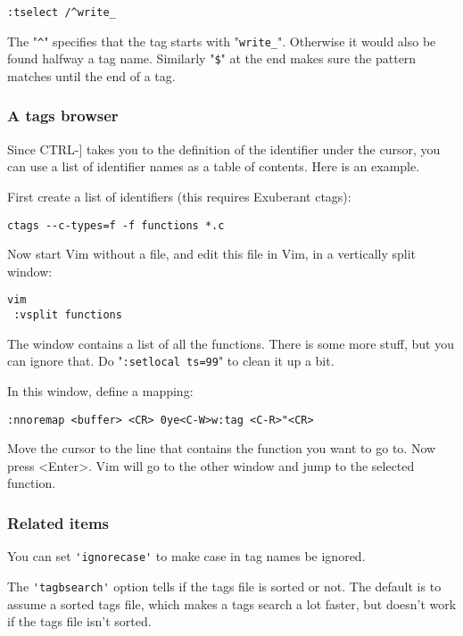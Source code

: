 \begin{Verbatim}[samepage=true]
 :tselect /^write_
\end{Verbatim}

The "\verb!^!" specifies that the tag starts with "\verb!write_!".
Otherwise it would also be found halfway a tag name.
Similarly "\verb!$!" at the end makes sure the pattern matches until the end of a tag.
\subsubsection{A tags browser}
Since CTRL-] takes you to the definition of the identifier under the cursor, you can use a list of identifier names as a table of contents.
Here is an example.

First create a list of identifiers (this requires Exuberant ctags):

\begin{Verbatim}[samepage=true]
 ctags --c-types=f -f functions *.c
\end{Verbatim}

Now start Vim without a file, and edit this file in Vim, in a vertically split window:

\begin{Verbatim}[samepage=true]
 vim
 :vsplit functions
\end{Verbatim}

The window contains a list of all the functions.
There is some more stuff, but you can ignore that.
Do "\verb!:setlocal ts=99!" to clean it up a bit.

In this window, define a mapping:

\begin{Verbatim}[samepage=true]
 :nnoremap <buffer> <CR> 0ye<C-W>w:tag <C-R>"<CR>
\end{Verbatim}

Move the cursor to the line that contains the function you want to go to.
Now press <Enter>.
Vim will go to the other window and jump to the selected function.
\subsubsection{Related items}
You can set \verb!'ignorecase'! to make case in tag names be ignored.

The \verb!'tagbsearch'! option tells if the tags file is sorted or not.
The default is to assume a sorted tags file, which makes a tags search a lot faster, but doesn't work if the tags file isn't sorted.

